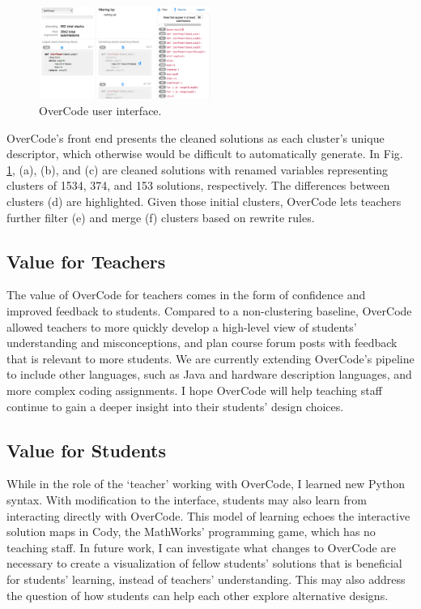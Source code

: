 \documentclass{sigchi}
\begin{document}
\begin{figure}[h!]
\centering
\includegraphics[width=0.5\textwidth]{frontPageInterfacePreviewLabeled.jpg}
\caption{OverCode user interface.}
\label{fig:figure1}
\end{figure}

OverCode's front end presents the cleaned solutions as each cluster's unique descriptor, which otherwise would be difficult to automatically generate. In Fig. \ref{fig:figure1}, (a), (b), and (c) are cleaned solutions with renamed variables representing clusters of 1534, 374, and 153 solutions, respectively. The differences between clusters (d) are highlighted. Given those initial clusters, OverCode lets teachers further filter (e) and merge (f) clusters based on rewrite rules.

\subsection{Value for Teachers}
The value of OverCode for teachers comes in the form of confidence and improved feedback to students. Compared to a non-clustering baseline, OverCode allowed teachers to more quickly develop a high-level view of students' understanding and misconceptions, and plan course forum posts with feedback that is relevant to more students. We are currently extending OverCode's pipeline to include other languages, such as Java and hardware description languages, and more complex coding assignments. I hope OverCode will help teaching staff continue to gain a deeper insight into their students' design choices.

\subsection{Value for Students}
While in the role of the `teacher' working with OverCode, I learned new Python syntax. With modification to the interface, students may also learn from interacting directly with OverCode. This model of learning echoes the interactive solution maps in Cody, the MathWorks' programming game, which has no teaching staff. In future work, I can investigate what changes to OverCode are necessary to create a visualization of fellow students' solutions that is beneficial for students' learning, instead of teachers' understanding. This may also address the question of how students can help each other explore alternative designs.
\end{document}
